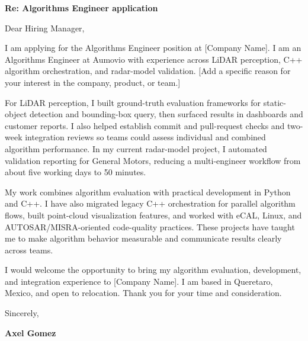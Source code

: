 


\textbf{Re: Algorithms Engineer application}

Dear Hiring Manager,

I am applying for the Algorithms Engineer position at [Company Name]. I am an Algorithms Engineer at Aumovio with experience across LiDAR perception, C++ algorithm orchestration, and radar-model validation. [Add a specific reason for your interest in the company, product, or team.]

For LiDAR perception, I built ground-truth evaluation frameworks for static-object detection and bounding-box query, then surfaced results in dashboards and customer reports. I also helped establish commit and pull-request checks and two-week integration reviews so teams could assess individual and combined algorithm performance. In my current radar-model project, I automated validation reporting for General Motors, reducing a multi-engineer workflow from about five working days to 50 minutes.

My work combines algorithm evaluation with practical development in Python and C++. I have also migrated legacy C++ orchestration for parallel algorithm flows, built point-cloud visualization features, and worked with eCAL, Linux, and AUTOSAR/MISRA-oriented code-quality practices. These projects have taught me to make algorithm behavior measurable and communicate results clearly across teams.

I would welcome the opportunity to bring my algorithm evaluation, development, and integration experience to [Company Name]. I am based in Queretaro, Mexico, and open to relocation. Thank you for your time and consideration.

\vspace{12pt}
Sincerely,

\vspace{8pt}
\textbf{Axel Gomez}
